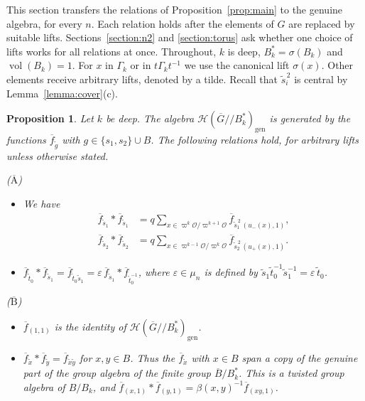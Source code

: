 \documentclass[12pt,letterpaper]{amsart}
\numberwithin{equation}{section}
\newtheorem{proposition}[theorem]{Proposition}
\theoremstyle{definition}
\theoremstyle{remark}
\DeclareMathOperator{\vol}{vol}
\newcommand{\cO}{\mathcal{O}}
\newcommand{\cH}{\mathcal{H}}
\newcommand{\Gbar}{\overline{G}}
\newcommand{\gen}{\mathrm{gen}}
\newcommand{\fbar}{\overline{f}}
\newcommand{\Hgen}{\cH(\Gbar/\!/B_k^*)_{\gen}}
\begin{document}
This section transfers the relations of Proposition~\ref{prop:main} to
the genuine algebra, for every $n$. Each relation holds after the
elements of $G$ are replaced by suitable lifts.
Sections~\ref{section:n2} and \ref{section:torus} ask whether one
choice of lifts works for all relations at once. Throughout, $k$ is deep,
$B_k^*=\sigma(B_k)$ and $\vol(B_k)=1$. For $x$ in $\Gamma_k$ or in
$t\Gamma_kt^{-1}$ we use the canonical lift $\sigma(x)$. Other elements
receive arbitrary lifts, denoted by a tilde. Recall that $\tilde
s_i^{\,2}$ is central by Lemma~\ref{lemma:cover}(c).

\begin{proposition}
\label{prop:main2}
Let $k$ be deep. The algebra $\Hgen$ is generated by the functions
$\fbar_{\tilde g}$ with $g\in\{s_1,s_2\}\cup B$. The following
relations hold, for arbitrary lifts unless otherwise stated.

\smallskip\noindent
\textup{($\overline{\mbox{A}}$)}
\begin{itemize}[leftmargin=3em]
\item[(i)] We have
\begin{align*}
\fbar_{\tilde s_1}*\fbar_{\tilde s_1}
&=q\sum_{x\in\varpi^k\cO/\varpi^{k+1}\cO}
\fbar_{\tilde s_1^{\,2}\,(u_-(x),1)},\\
\fbar_{\tilde s_2}*\fbar_{\tilde s_2}
&=q\sum_{x\in\varpi^{k-1}\cO/\varpi^{k}\cO}
\fbar_{\tilde s_2^{\,2}\,(u_+(x),1)}.
\end{align*}
\item[(ii)] $\fbar_{\tilde t_0}*\fbar_{\tilde s_1}
=\fbar_{\tilde t_0\tilde s_1}
=\varepsilon\,\fbar_{\tilde s_1}*\fbar_{\tilde t_0^{-1}}$, where
$\varepsilon\in\mu_n$ is defined by
$\tilde s_1\tilde t_0^{-1}\tilde s_1^{-1}=\varepsilon\,\tilde t_0$.
\end{itemize}

\noindent
\textup{($\overline{\mbox{B}}$)}
\begin{itemize}[leftmargin=3em]
\item[(i)] $\fbar_{(1,1)}$ is the identity of $\Hgen$.
\item[(ii)] $\fbar_{\tilde x}*\fbar_{\tilde y}=\fbar_{\tilde x\tilde y}$
for $x,y\in B$. Thus the $\fbar_{\tilde x}$ with $x\in B$ span a copy
of the genuine part of the group algebra of the finite group
$\overline{B}/B_k^*$. This is a twisted group algebra of $B/B_k$, and
$\fbar_{(x,1)}*\fbar_{(y,1)}=\beta(x,y)^{-1}\fbar_{(xy,1)}$.
\end{itemize}


\end{proposition}
\end{document}
